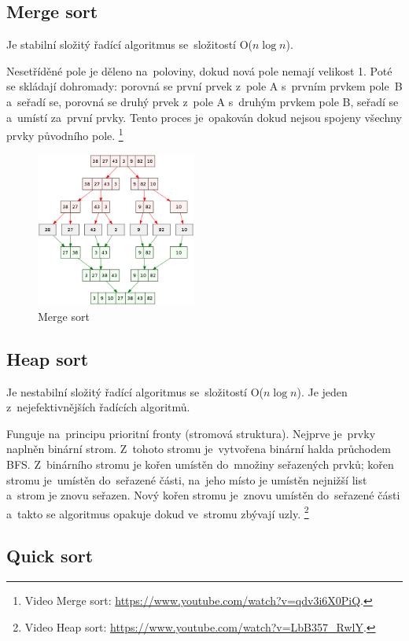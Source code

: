\subsection{Merge sort}

Je stabilní složitý řadící algoritmus se~složitostí O(\( n\log{n} \)).

Nesetříděné pole je děleno na~poloviny, dokud nová pole nemají velikost 1. Poté se skládají dohromady: porovná se první prvek z~pole A s~prvním prvkem pole~B a~seřadí se, porovná se druhý prvek z~pole A s~druhým prvkem pole B, seřadí se a~umístí za~první prvky. Tento proces je~opakován dokud nejsou spojeny všechny prvky původního pole.%
\footnote{Video Merge sort: \url{https://www.youtube.com/watch?v=qdv3i6X0PiQ}.}

\begin{figure}[ht]
	\centering
	\includegraphics[width=0.47\textwidth]{images/merge-sort}
	\caption{Merge sort}
\end{figure}

\subsection{Heap sort}

Je nestabilní složitý řadící algoritmus se~složitostí O(\( n\log{n} \)). Je jeden z~nejefektivnějších řadících algoritmů.

Funguje na~principu prioritní fronty (stromová struktura). Nejprve je~prvky naplněn binární strom. Z~tohoto stromu je~vytvořena binární halda průchodem BFS. Z~binárního stromu je kořen umístěn do~množiny seřazených prvků; kořen stromu je~umístěn do~seřazené části, na~jeho místo je umístěn nejnižší list a~strom je znovu seřazen. Nový kořen stromu je~znovu umístěn do~seřazené části a~takto se algoritmus opakuje dokud ve~stromu zbývají uzly.%
\footnote{Video Heap sort: \url{https://www.youtube.com/watch?v=LbB357_RwlY}.}

\subsection{Quick sort}

